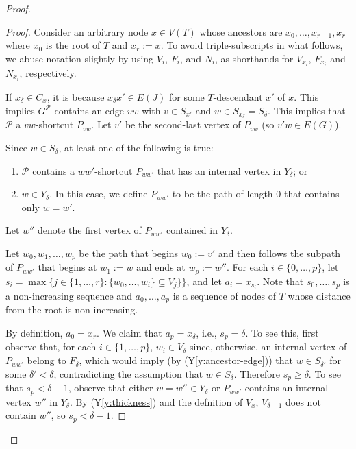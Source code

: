 \documentclass{patmorin}
\newcommand{\yref}[1]{(Y\ref{y:#1})}
\renewcommand{\ge}{\geqslant}
\begin{document}
\begin{proof}
\begin{proof}
  Consider an arbitrary node $x\in V(T)$ whose ancestors are $x_0,\ldots,x_{r-1},x_r$ where $x_0$ is the root of $T$ and $x_r:=x$.  To avoid triple-subscripts in what follows, we abuse notation slightly by using $V_i$, $F_i$, and $N_i$,  as shorthands for $V_{x_i}$, $F_{x_i}$ and $N_{x_i}$, respectively.   

  If $x_\delta\in C_x$, it is because $x_\delta x'\in E(J)$ for some $T$-descendant $x'$ of $x$.  This implies $G^{\mathcal{P}}$ contains an edge $vw$ with $v\in S_{x'}$ and $w\in S_{x_\delta}=S_\delta$.  This implies that $\mathcal{P}$ a $vw$-shortcut $P_{vw}$.  Let $v'$ be the second-last vertex of $P_{vw}$ (so $v'w\in E(G)$).  
  
  Since $w\in S_{\delta}$, at least one of the following is true:
  \begin{enumerate}
    \item $\mathcal{P}$ contains a $ww'$-shortcut $P_{ww'}$ that has an internal vertex in $Y_{\delta}$; or
    \item $w\in Y_\delta$.  In this case, we define $P_{ww'}$ to be the path of length 0 that contains only $w=w'$. 
  \end{enumerate}
  Let $w''$ denote the first vertex of $P_{ww'}$ contained in $Y_{\delta}$.
  
  Let $w_0,w_1,\ldots,w_p$ be the path that begins $w_0:=v'$ and then follows the subpath of $P_{ww'}$ that begins at $w_1:=w$ and ends at $w_p:=w''$.  For each $i\in\{0,\ldots,p\}$, let $s_i=\max\{j\in\{1,\ldots,r\}: \{w_0,\ldots,w_i\}\subseteq V_{j}\}\}$, and let $a_i=x_{s_i}$.  Note that $s_0,\ldots,s_p$ is a non-increasing sequence and $a_0,\ldots,a_p$ is a sequence of nodes of $T$ whose distance from the root is non-increasing.

  By definition, $a_0=x_r$.  We claim that $a_p=x_\delta$, i.e., $s_p=\delta$. 
  To see this, first observe that, for each $i\in\{1,\ldots,p\}$, $w_i\in V_{\delta}$ since, otherwise, an internal vertex of $P_{ww'}$ belong to $F_\delta$, which would imply (by \yref{ancestor-edge}) that $w\in S_{\delta'}$ for some $\delta' < \delta$, contradicting the assumption that $w\in S_\delta$.  Therefore $s_p\ge\delta$.  To see that $s_p<\delta-1$,
  observe that either $w=w''\in Y_\delta$ or $P_{ww'}$ contains an internal vertex $w''$ in $Y_\delta$.  By \yref{thickness} and the defnition of $V_x$, $V_{\delta-1}$ does not contain $w''$, so $s_p<\delta-1$.
  

\end{proof}
\end{proof}
\end{document}
